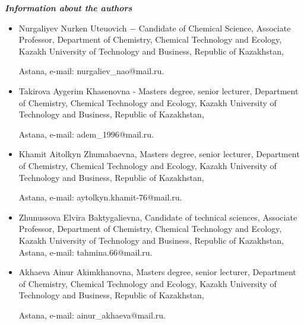 \emph{{\bfseries Information about the authors}}

\begin{itemize}
\item
Nurgaliyev Nurken Uteuovich − Candidate of Chemical Science, Associate
Professor, Department of Chemistry, Chemical Technology and Ecology,
Kazakh University of Technology and Business, Republic of Kazakhstan,

Astana, e-mail: nurgaliev\_nao@mail.ru.

\item
Takirova Aygerim Khasenovna - Master\textquotesingle s degree, senior
lecturer, Department of Chemistry, Chemical Technology and Ecology,
Kazakh University of Technology and Business, Republic of Kazakhstan,

Astana, e-mail: adem\_1996@mail.ru.

\item
Khamit Aitolkyn Zhumabaevna, Master\textquotesingle s degree, senior
lecturer, Department of Chemistry, Chemical Technology and Ecology,
Kazakh University of Technology and Business, Republic of Kazakhstan,

Astana, e-mail: aytolkyn.khamit-76@mail.ru.

\item
Zhunussova Elvira Baktygalievna, Candidate of technical sciences,
Associate Professor, Department of Chemistry, Chemical Technology and
Ecology, Kazakh University of Technology and Business, Republic of
Kazakhstan, Astana, e-mail: tahmina.66@mail.ru.

\item
Akhaeva Ainur Akimkhanovna, Master\textquotesingle s degree, senior
lecturer, Department of Chemistry, Chemical Technology and Ecology,
Kazakh University of Technology and Business, Republic of Kazakhstan,

Astana, e-mail: ainur\_akhaeva@mail.ru.
\end{itemize}
